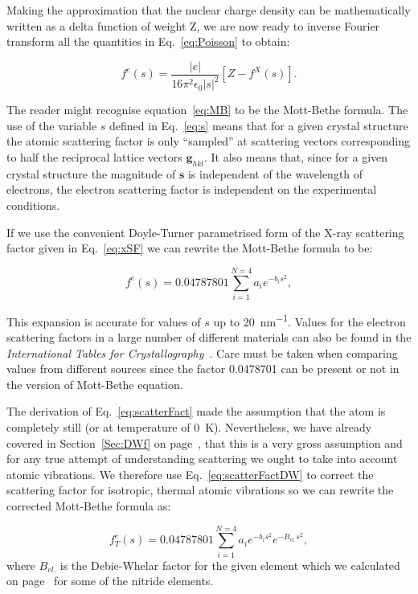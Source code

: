 Making the approximation that the nuclear charge density can be mathematically written as a delta function of weight Z, we are now ready to inverse Fourier transform all the quantities in Eq.~\ref{eq:Poisson} to obtain:

\begin{equation}
f^e(s)  = \frac{|e|}{16 \pi^2 \epsilon_0 |s|^2} \left[Z-f^X(s) \right].
\label{eq:MB}
\end{equation}

The reader might recognise equation~\ref{eq:MB} to be the Mott-Bethe formula. The use of the variable $s$ defined in Eq.~\ref{eq:s} means that for a given crystal structure the atomic scattering factor is only ``sampled'' at scattering vectors corresponding to half the reciprocal lattice vectors $\mathbf{g}_{hkl}$. It also means that, since for a given crystal structure the magnitude of $\mathbf{s}$ is independent of the wavelength of electrons, the electron scattering factor is independent on the experimental conditions. 

If we use the convenient Doyle-Turner parametrised form of the X-ray scattering factor given in Eq.~\ref{eq:xSF} we can rewrite the Mott-Bethe formula to be:

\begin{equation}
\label{eq:scatterFact}
f^e(s) = 0.04787801\sum_{i=1}^{N=4}a_ie^{-b_is^2},
\end{equation}

This expansion is accurate for values of $s$ up to 20~\si{\nano\meter^{-1}}. Values for the electron scattering factors in a large number of different materials can also be found in the \textit{International Tables for Crystallography}~\cite{IntTableCrysC}. Care must be taken when comparing values from different sources since the factor 0.0478701 can be present or not in the version of Mott-Bethe equation. 

The derivation of Eq.~\ref{eq:scatterFact} made the assumption that the atom is completely still (or at temperature of \SI{0}{K}). Nevertheless, we have already covered in Section~\ref{Sec:DWf} on page~\pageref{Sec:DWf}, that this is a very gross assumption and for any true attempt of understanding scattering we ought to take into account atomic vibrations. We therefore use Eq.~\ref{eq:scatterFactDW} to correct the scattering factor for isotropic, thermal atomic vibrations so we can rewrite the corrected Mott-Bethe formula as:

\begin{equation}
\label{eq:scatterFactDW}
f_T^e(s) = 0.04787801\sum_{i=1}^{N=4} a_i e^{-b_i s^2}  e^{-B_{el.} s^2},
\end{equation}
where $B_{el.}$ is the Debie-Whelar factor for the given element which we calculated on page~\pageref{Sec:DWf} for some of the nitride elements.

